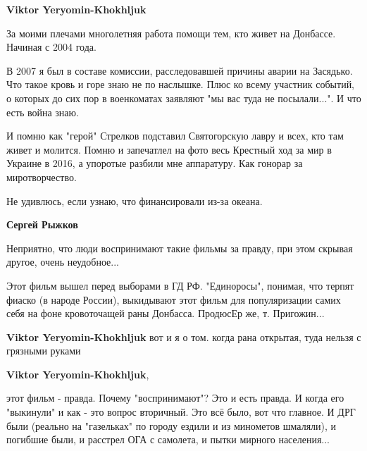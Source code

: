 \begin{itemize}
\begin{itemize}
\textbf{Viktor Yeryomin-Khokhljuk} 

За моими плечами многолетняя работа помощи тем, кто живет на Донбассе. Начиная
с 2004 года.

В 2007 я был в составе комиссии, расследовавшей причины аварии на Засядько. Что
такое кровь и горе знаю не по наслышке. Плюс ко всему участник событий, о
которых до сих пор в военкоматах заявляют "мы вас туда не посылали...". И что
есть война знаю.


И помню как "герой" Стрелков подставил Святогорскую лавру и всех, кто там живет
и молится. Помню и запечатлел на фото весь Крестный ход за мир в Украине в
2016, а упоротые разбили мне аппаратуру. Как гонорар за миротворчество.

Не удивлюсь, если узнаю, что финансировали из-за океана.

 
\textbf{Сергей Рыжков}

Неприятно, что люди воспринимают такие фильмы за правду, при этом скрывая другое, очень неудобное...

Этот фильм вышел перед выборами в ГД РФ. "Единоросы", понимая, что терпят
фиаско (в народе России), выкидывают этот фильм для популяризации самих себя на
фоне кровоточащей раны Донбасса. ПродюсЕр же, т. Пригожин...


 
\textbf{Viktor Yeryomin-Khokhljuk} вот и я о том. когда рана открытая, туда нельзя с грязными руками

 
\textbf{Viktor Yeryomin-Khokhljuk}, 

этот фильм - правда. Почему "воспринимают"? Это и есть правда. И когда его
"выкинули" и как - это вопрос вторичный. Это всё было, вот что главное. И ДРГ
были (реально на "газельках" по городу ездили и из минометов шмаляли), и
погибшие были, и расстрел ОГА с самолета, и пытки мирного населения... 


\end{itemize}
\end{itemize}
